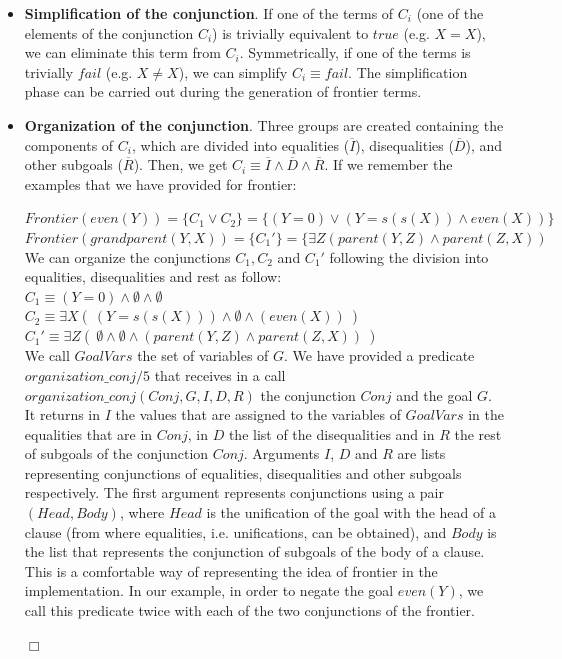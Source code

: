 \documentclass{tlp}
\newcommand{\implementation}[1]{\noindent{\sc Implementation details:}
  #1 $\Box$}
\begin{document}
\begin{itemize}
\item {\bf Simplification of the conjunction}. If one of the terms of
$C_i$ (one of the elements of the conjunction $C_i$) is trivially
equivalent to $true$ (e.g. $X=X$), we can eliminate this term from
$C_i$. Symmetrically, if one of the terms is trivially $fail$ (e.g. $X
\neq X$), we can simplify $C_i \equiv fail$. The simplification phase
can be carried out during the generation of frontier terms.

\item {\bf Organization of the conjunction}. Three groups are created
containing the components of $C_i$, which are divided into equalities
($\overline{I}$), disequalities ($\overline{D}$), and other subgoals
($\overline{R}$).  Then, we get $C_i \equiv \overline{I} \wedge
\overline{D} \wedge \overline{R}$. If we remember the examples that we have
provided for frontier:

$Frontier(even(Y)) = \{ C_1  \vee  C_2 \} = \{ ( Y=0 ) \vee ( Y=s(s(X)) \wedge
even(X) ) \}$ \\
$Frontier(grandparent(Y,X)) = \{ C_1'\} =   \{ \exists Z (parent(Y,Z) \wedge
parent(Z,X) )$ \\

We can organize the conjunctions $C_1, C_2$ and $C_1'$ following the division
into equalities, disequalities and rest as follow:\\
$C_1 \equiv ( Y=0 )  \wedge  \emptyset \wedge \emptyset$ \\
$C_2 \equiv  \exists X (~( Y=s(s(X)) ) \wedge \emptyset \wedge ( even(X) )~ )$ \\
$C_1' \equiv \exists Z (~ \emptyset \wedge \emptyset \wedge ( parent(Y,Z) \wedge
parent(Z,X)  ) ~)$ \\


\implementation{ We call $GoalVars$ the set of variables of $G$. We
have provided a predicate $organization\_conj/5$ that receives in a
call $organization\_conj(Conj,G,I,D,R)$ the conjunction $Conj$ and the
goal $G$. It returns in $I$ the values that are assigned to the
variables of $GoalVars$ in the equalities that are in $Conj$, in $D$
the list of the disequalities and in $R$ the rest of subgoals of the
conjunction $Conj$. Arguments $I$, $D$ and $R$ are lists representing
conjunctions of equalities, disequalities and other subgoals
respectively. The first argument represents conjunctions using a pair
$(Head,Body)$, where $Head$ is the unification of the goal with the
head of a clause (from where equalities, i.e.  unifications, can be
obtained), and $Body$ is the list that represents the conjunction of
subgoals of the body of a clause. This is a comfortable way of representing the idea of frontier in the implementation. In our example, in order to negate
the goal $even(Y)$, we call this predicate twice with each of the two
conjunctions of the frontier.

}
\end{itemize}
\end{document}

